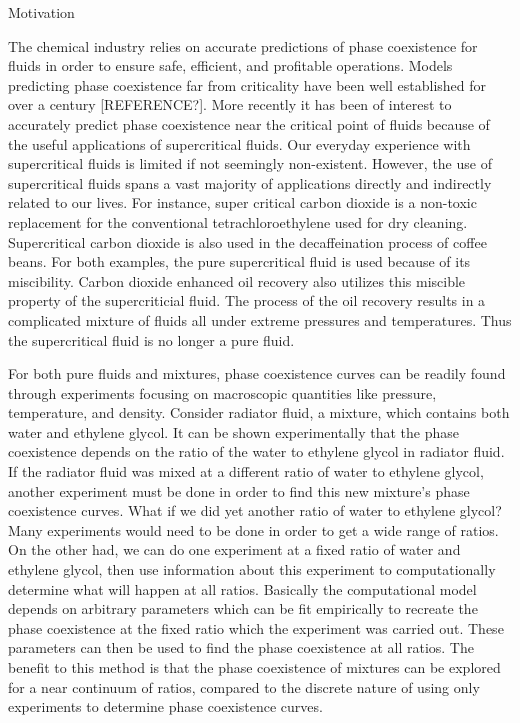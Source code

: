 \begin{section}{Motivation}

The chemical industry relies on accurate predictions of phase coexistence for fluids in order to ensure safe, efficient, and profitable operations.  Models predicting phase coexistence far from criticality have been well established for over a century [REFERENCE?].  More recently it has been of interest to accurately predict phase coexistence near the critical point of fluids because of the useful applications of supercritical fluids.  Our everyday experience with supercritical fluids is limited if not seemingly non-existent.  However, the use of supercritical fluids spans a vast majority of applications directly and indirectly related to our lives.  For instance, super critical carbon dioxide is a non-toxic replacement for the conventional tetrachloroethylene used for dry cleaning.  Supercritical carbon dioxide is also used in the decaffeination process of coffee beans.  For both examples, the pure supercritical fluid is used because of its miscibility.  Carbon dioxide enhanced oil recovery also utilizes this miscible property of the supercriticial fluid.  The process of the oil recovery results in a complicated mixture of fluids all under extreme pressures and temperatures.  Thus the supercritical fluid is no longer a pure fluid.           

For both pure fluids and mixtures, phase coexistence curves can be readily found through experiments focusing on macroscopic quantities like pressure, temperature, and density.  Consider radiator fluid, a mixture, which contains both water and ethylene glycol.  It can be shown experimentally that the phase coexistence depends on the ratio of the water to ethylene glycol in radiator fluid.  If the radiator fluid was mixed at a different ratio of water to ethylene glycol, another experiment must be done in order to find this new mixture's phase coexistence curves.  What if we did yet another ratio of water to ethylene glycol?  Many experiments would need to be done in order to get a wide range of ratios.  On the other had, we can do one experiment at a fixed ratio of water and ethylene glycol, then use information about this experiment to computationally determine what will happen at all ratios.  Basically the computational model depends on arbitrary parameters which can be fit empirically to recreate the phase coexistence at the fixed ratio which the experiment was carried out.  These parameters can then be used to find the phase coexistence at all ratios.  The benefit to this method is that the phase coexistence of mixtures can be explored for a near continuum of ratios, compared to the discrete nature of using only experiments to determine phase coexistence curves. 


\end{section}
